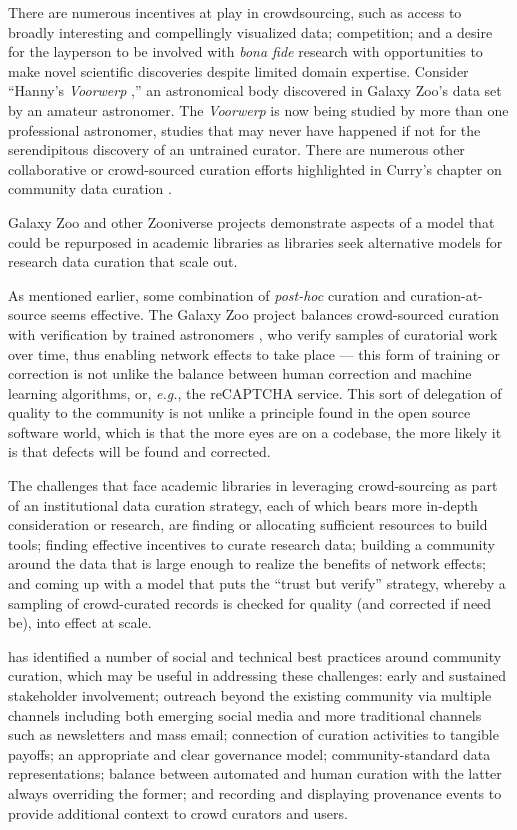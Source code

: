 \documentclass[man,12pt,biblatex]{apa6}
\begin{document}
There are numerous incentives at play in crowdsourcing, such as access
to broadly interesting and compellingly visualized data; competition;
and a desire for the layperson to be involved with \textit{bona fide}
research with opportunities to make novel scientific discoveries
despite limited domain expertise. Consider ``Hanny's
\textit{Voorwerp} \parencite{wiki:voorwerp},'' an astronomical body
discovered in Galaxy Zoo's data set by an amateur astronomer. The
\textit{Voorwerp} is now being studied by more than one professional
astronomer, studies that may never have happened if not for the
serendipitous discovery of an untrained curator.  There are numerous
other collaborative or crowd-sourced curation efforts highlighted in
Curry's chapter on community data curation \parencite{curry:community}.

Galaxy Zoo and other Zooniverse projects demonstrate aspects of a
model that could be repurposed in academic libraries as libraries seek
alternative models for research data curation that scale out.

As mentioned earlier, some combination of \textit{post-hoc} curation
and curation-at-source seems effective. The Galaxy Zoo project
balances crowd-sourced curation with verification by trained
astronomers \parencite{adams:galaxyzoo}, who verify samples of curatorial
work over time, thus enabling network effects to take place --- this
form of training or correction is not unlike the balance between human
correction and machine learning algorithms, or, \textit{e.g.}, the
reCAPTCHA 
service. This sort of delegation of quality to the community is not
unlike a principle found in the open source software world, which is
that the more eyes are on a codebase, the more likely it is that
defects will be found and corrected.

The challenges that face academic libraries in leveraging
crowd-sourcing as part of an institutional data curation strategy,
each of which bears more in-depth consideration or research, are
finding or allocating sufficient resources to build tools; finding
effective incentives to curate research data; building a community
around the data that is large enough to realize the benefits of
network effects; and coming up with a model that puts the ``trust but
verify'' strategy, whereby a sampling of crowd-curated records is
checked for quality (and corrected if need be), into effect at scale.

\textcite{curry:community} has identified a number of social and
technical best practices around community curation, which may be
useful in addressing these challenges: early and sustained stakeholder
involvement; outreach beyond the existing community via multiple
channels including both emerging social media and more traditional
channels such as newsletters and mass email; connection of curation
activities to tangible payoffs; an appropriate and clear governance
model; community-standard data representations; balance between
automated and human curation with the latter always overriding the
former; and recording and displaying provenance events to provide
additional context to crowd curators and users.
\end{document}
